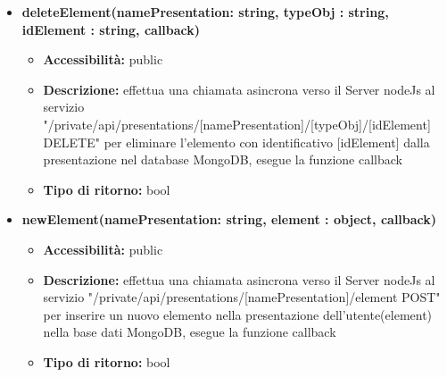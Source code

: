 {{\begin{itemize}
		\item \textbf{deleteElement(namePresentation: string, typeObj : string, idElement : string, callback) }
			\begin{itemize}
			\item \textbf{Accessibilit\`{a}:} public
			\item \textbf{Descrizione:} effettua una chiamata asincrona verso il Server nodeJs al servizio "/private/api/presentations/[namePresentation]/[typeObj]/[idElement] DELETE" per eliminare l'elemento con identificativo [idElement] dalla presentazione nel database MongoDB, esegue la funzione callback
			\item \textbf{Tipo di ritorno:} bool
			\end{itemize}
			
		\item \textbf{newElement(namePresentation: string, element : object, callback)}
			\begin{itemize}
			\item \textbf{Accessibilit\`{a}:} public
			\item \textbf{Descrizione:} effettua una chiamata asincrona verso il Server nodeJs al servizio "/private/api/presentations/[namePresentation]/element POST" per inserire un nuovo elemento nella presentazione dell'utente(element) nella base dati MongoDB, esegue la funzione callback
 			\item \textbf{Tipo di ritorno:} bool
			\end{itemize}

		\end{itemize}
	}
}
	
	
	
	
	
	
	
	
	
	
	
	
	
	
	